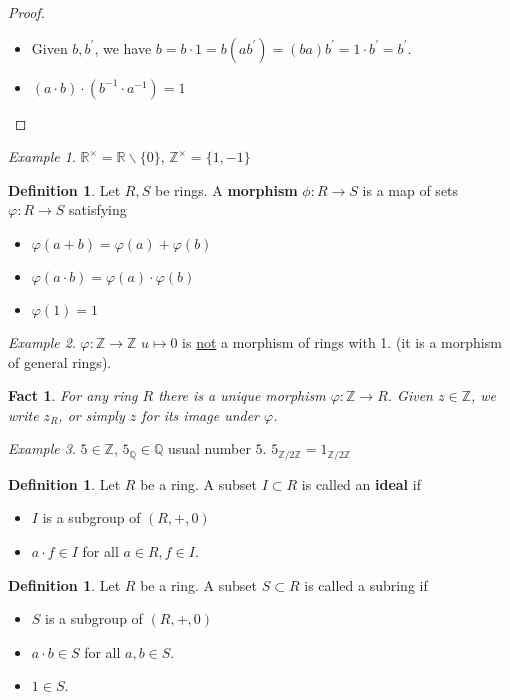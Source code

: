 \documentclass{amsart}
\newcommand{\RR}{\mathbb{R}}
\newcommand{\QQ}{\mathbb{Q}}
\newcommand{\ZZ}{\mathbb{Z}}
\newcommand{\Zn}[1]{\mathbb{Z} / #1 \mathbb{Z}}
\newtheorem{fact}[thm]{Fact}
\theoremstyle{definition}
\newtheorem{defn}[thm]{Definition}
\theoremstyle{remark}
\newtheorem*{ex}{Example}
\begin{document}
\begin{proof} \hspace{0.5cm}
    \begin{itemize}
        \item Given $b, b^\prime$, we have $b = b \cdot 1 = b(ab^\prime) = (ba)b^\prime = 1 \cdot b^\prime
         = b^\prime$.
         \item $(a \cdot b) \cdot (b^{-1} \cdot a^{-1}) = 1$
    \end{itemize}
\end{proof}
\begin{ex}
    $\RR^\times = \RR \backslash \{0\}$, $\ZZ^\times = \{1, -1\}$
\end{ex}
\begin{defn}
    Let $R, S$ be rings. A \textbf{morphism} $\phi:R \rightarrow S$ is a map of
    sets $\varphi:R \rightarrow S$ satisfying
    \begin{itemize}
        \item $\varphi(a + b) = \varphi(a) + \varphi(b)$
        \item $\varphi(a \cdot b) = \varphi(a) \cdot \varphi(b)$
        \item $\varphi(1) = 1$
    \end{itemize}
\end{defn}
\begin{ex}
    $\varphi:\ZZ \rightarrow \ZZ$ $u \mapsto 0$ is \underline{not} a morphism of
    rings with 1. (it is a morphism of general rings).
\end{ex}
\begin{fact}
    For any ring $R$ there is a unique morphism $\varphi:\ZZ \rightarrow R$. Given
    $z \in \ZZ$, we write $z_{R}$, or simply $z$ for its image under $\varphi$.
\end{fact}
\begin{ex}
    $5 \in \ZZ$, $5_{\QQ} \in \QQ$ usual number $5$. $5_{\Zn 2} = 1_{\Zn 2}$
\end{ex}
\begin{defn}
    Let $R$ be a ring. A subset $I \subset R$ is called an \textbf{ideal} if
    \begin{itemize}
        \item $I$ is a subgroup of $(R, +, 0)$
        \item $a \cdot f \in I$ for all $a \in R, f \in I$.
    \end{itemize}
\end{defn}
\begin{defn}
    Let $R$ be a ring. A subset $S \subset R$ is called a subring if
    \begin{itemize}
        \item $S$ is a subgroup of $(R, +, 0)$
        \item $a \cdot b \in S$ for all $a, b \in S$.
        \item $1 \in S$.
    \end{itemize}
\end{defn}
\end{document}
